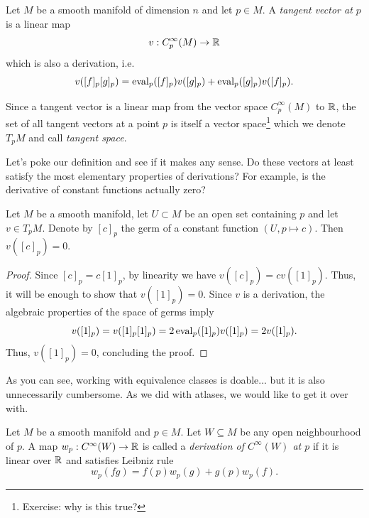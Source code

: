 \begin{definition}
	Let $M$ be a smooth manifold of dimension $n$ and let $p\in M$.
	A \emph{tangent vector at $p$} is a linear map
	\begin{equation}\label{def:tangentvector}
		v: C_p^\infty(M)\to\mathbb{R}
	\end{equation}
	which is also a derivation, i.e.
	\begin{equation}
		v([f]_p [g]_p) =
		\operatorname{eval}_p([f]_p)v([g]_p)
		+ \operatorname{eval}_p([g]_p)v([f]_p).
	\end{equation}

	Since a tangent vector is a linear map from the vector space $C_p^\infty(M)$ to $\mathbb{R}$, the set of all tangent vectors at a point $p$ is itself a vector space\footnote{Exercise: why is this true?} which we denote $T_p M$ and call \emph{tangent space}.
\end{definition}

Let's poke our definition and see if it makes any sense.
Do these vectors at least satisfy the most elementary properties of derivations?
For example, is the derivative of constant functions actually zero?

\begin{lemma}\label{lem:f'0is0forconst}
	Let $M$ be a smooth manifold, let $U\subset M$ be an open set containing $p$ and let $v\in T_p M$.
	Denote by $[c]_p$ the germ of a constant function $(U, p \mapsto c)$.
	Then $v([c]_p) = 0$.
\end{lemma}
\begin{proof}
	Since $[c]_p = c [1]_p$, by linearity we have $v([c]_p) = c v([1]_p)$.
	Thus, it will be enough to show that $v([1]_p) = 0$.
	Since $v$ is a derivation, the algebraic properties of the space of germs imply
	\begin{equation}
		v([1]_p) = v([1]_p [1]_p) = 2 \operatorname{eval}_p([1]_p)v([1]_p) = 2 v([1]_p).
	\end{equation}
	Thus, $v([1]_p) = 0$, concluding the proof.
\end{proof}

As you can see, working with equivalence classes is doable... but it is also unnecessarily cumbersome.
As we did with atlases, we would like to get it over with.

\begin{definition}
	Let $M$ be a smooth manifold and $p\in M$.
	Let $W\subseteq M$ be any open neighbourhood of $p$.
	A map $w_p:C^\infty(W)\to\mathbb{R}$ is called a \emph{derivation of $C^\infty(W)$ at $p$} if it is linear over $\mathbb{R}$ and satisfies Leibniz rule
	\begin{equation}
		w_p(fg) = f(p)w_p(g) + g(p)w_p(f).
	\end{equation}
\end{definition}

